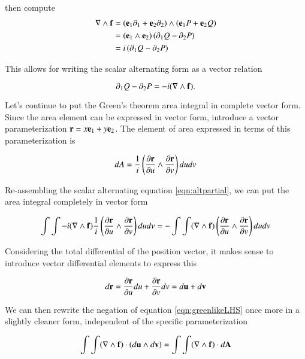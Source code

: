 \documentclass{article}
\newcommand{\grad}[0]{\nabla}
\newcommand{\PD}[2]{\frac{\partial {#2}}{\partial {#1}}}
\begin{document}
then compute
\begin{align*}
\grad \wedge \Bf
&= \left( \Be_1 \partial_1 + \Be_2 \partial_2 \right) \wedge \left( \Be_1 P + \Be_2 Q \right) \\
&= (\Be_{1} \wedge \Be_2) \left( \partial_1 Q - \partial_2 P \right) \\
&= i \left( \partial_1 Q - \partial_2 P \right) \\
\end{align*}

This allows for writing the scalar alternating form as a vector relation

\begin{equation}\label{eqn:altpartial}
\partial_1 Q - \partial_2 P = - i(\grad \wedge \Bf).
\end{equation}

Let's continue to put the Green's theorem area integral in complete vector form.
Since the area element can be expressed in vector form, introduce a vector parameterization $\mathbf{r} = x \mathbf{e}_1 + y \mathbf{e}_2$.  The element
of area expressed in terms of this parameterization is

\begin{equation*}
dA = \inv{i}\left( \PD{u}{\Br} \wedge \PD{v}{\Br} \right) du dv
\end{equation*}

Re-assembling the scalar alternating equation \ref{eqn:altpartial}, we can put the area integral
completely in vector form

\begin{equation}\label{eqn:greenlikeLHS}
\int\int - i(\grad \wedge \Bf) \inv{i}\left( \PD{u}{\Br} \wedge \PD{v}{\Br} \right) du dv
= -\int\int (\grad \wedge \Bf) \left( \PD{u}{\Br} \wedge \PD{v}{\Br} \right) du dv
\end{equation}

Considering the total differential of the position vector, it makes sense to introduce vector differential elements to
express this

\begin{equation*}
d\Br = \PD{u}{\Br} du + \PD{v}{\Br} dv = d\Bu + d\Bv
\end{equation*}

We can then rewrite the negation of equation \ref{eqn:greenlikeLHS}
once more in a slightly cleaner form, independent of the specific parameterization

\begin{equation}\label{eqn:greenlikeLHSFinal}
\int\int (\grad \wedge \Bf) \cdot (d\Bu \wedge d\Bv) = \int\int (\grad \wedge \Bf) \cdot d\BA
\end{equation}
\end{document}
